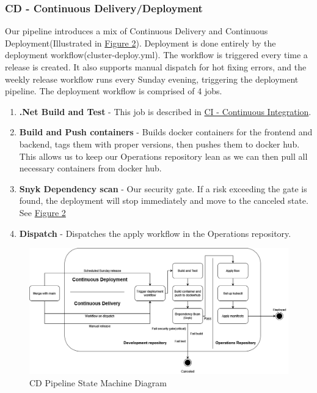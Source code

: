 \subsubsection{CD - Continuous Delivery/Deployment}
\label{subsubsec:cd}

Our pipeline introduces a mix of Continuous Delivery and Continuous Deployment(Illustrated in \hyperref[fig:CDStateMachine]{Figure 2}). Deployment is done entirely by the deployment workflow(cluster-deploy.yml).
The workflow is triggered every time a release is created. It also supports manual dispatch for hot fixing errors, and the weekly release workflow runs every Sunday evening, triggering the deployment pipeline. The deployment workflow is comprised of 4 jobs.
\begin{enumerate}
    \item \textbf{.Net Build and Test} - This job is described in \hyperref[subsubsec:ci]{CI - Continuous Integration}.
    \item \textbf{Build and Push containers} - Builds docker containers for the frontend and backend, tags them with proper versions, then pushes them to docker hub. This allows us to keep our Operations repository lean as we can then pull all necessary containers from docker hub.
    \item \textbf{Snyk Dependency scan} - Our security gate. If a risk exceeding the gate is found, the deployment will stop immediately and move to the canceled state. See \hyperref[fig:CDStateMachine]{Figure 2}
    \item \textbf{Dispatch} - Dispatches the apply workflow in the Operations repository.
\end{enumerate}

\begin {figure}[H]
    \centering
    \includegraphics[scale=0.50]{images/ci_cd_diagrams/DevopsDiagrams-StateMachineCd.drawio.png}
    \caption{CD Pipeline State Machine Diagram}
    \label{fig:CDStateMachine}
\end{figure}

